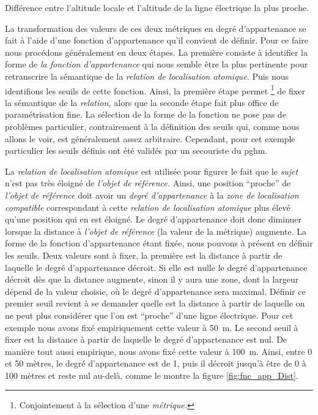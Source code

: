 \begin{carte}
  \centering
  
  \caption{Différence entre l'altitude locale et l'altitude de la
    ligne électrique la plus proche.}
  \label{fig:ISO_DALT_HT}
\end{carte}

La transformation des valeurs de ces deux métriques en degré
d'appartenance se fait à l'aide d'une fonction d'appartenance qu'il
convient de définir. Pour ce faire nous procédons généralement en deux
étapes. La première consiste à identifier la forme de \emph{la
  fonction d'appartenance} qui nous semble être la plus pertinente
pour retranscrire la sémantique de la \emph{relation de localisation
  atomique.} Puis nous identifions les seuils de cette
fonction. Ainsi, la première étape permet \footnote{Conjointement à la
  sélection d'une \emph{métrique.}} de fixer la sémantique de la
\emph{relation,} alors que la seconde étape fait plus office de
paramétrisation fine. La sélection de la forme de la fonction ne pose
pas de problèmes particulier, contrairement à la définition des seuils
qui, comme nous allons le voir, est généralement assez
arbitraire. Cependant, pour cet exemple particulier les seuils définis
ont été validés par un secouriste du \ac{pghm}.

La \emph{relation de localisation atomique}
est utilisée pour figurer le fait que le \emph{sujet} n'est pas très
éloigné de \emph{l'objet de référence.} Ainsi, une position
\enquote{proche} de \emph{l'objet de référence} doit avoir un
\emph{degré d'appartenance} à la \emph{zone de localisation
  compatible} correspondant à cette \emph{relation de localisation
  atomique} plus élevé qu'une position qui en est éloigné. Le degré
d'appartenance doit donc diminuer lorsque la distance à \emph{l'objet
  de référence} (\ie la valeur de la métrique) augmente. La forme de
la fonction d'appartenance étant fixée, nous pouvons à présent en
définir les seuils. Deux valeurs sont à fixer, la première est la
distance à partir de laquelle le degré d'appartenance décroit. Si elle
est nulle le degré d’appartenance décroit dès que la distance
augmente, sinon il y aura une zone, dont la largeur dépend de la
valeur choisie, où le degré d'appartenance sera maximal. Définir ce
premier seuil revient à se demander quelle est la distance à partir de
laquelle on ne peut plus considérer que l'on est \enquote{proche}
d'une ligne électrique. Pour cet exemple nous avons fixé empiriquement
cette valeur à \SI{50}{\meter}. Le second seuil à fixer est la
distance à partir de laquelle le degré d'appartenance est nul. De
manière tout aussi empirique, nous avons fixé cette valeur à
\SI{100}{\meter}. Ainsi, entre 0 et 50 mètres, le degré d'appartenance
est de 1, puis il décroit jusqu’à être de 0 à 100 mètres et reste nul
au-delà, comme le montre la figure \ref{fig:fnc_app_Dist}.

